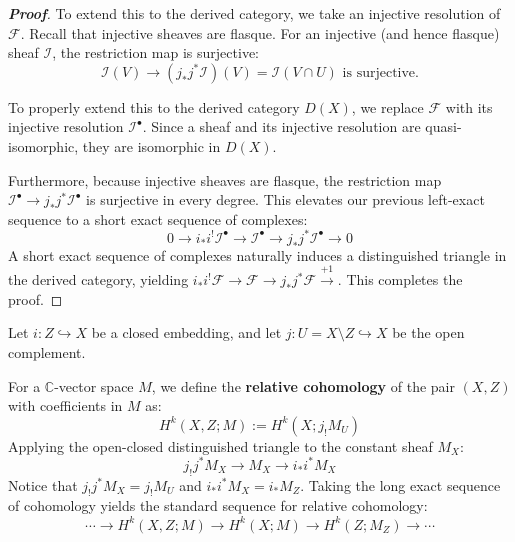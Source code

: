 \begin{proof}[\textbf{Proof}]
To extend this to the derived category, we take an injective resolution of $\mathcal{F}$. Recall that injective sheaves are flasque. For an injective (and hence flasque) sheaf $\mathcal{I}$, the restriction map is surjective:
\begin{equation*}
    \mathcal{I}(V) \longrightarrow (j_* j^* \mathcal{I})(V) = \mathcal{I}(V \cap U) \text{ is surjective.}
\end{equation*}

To properly extend this to the derived category $D(X)$, we replace $\mathcal{F}$ with its injective resolution $\mathcal{I}^\bullet$. Since a sheaf and its injective resolution are quasi-isomorphic, they are isomorphic in $D(X)$. 

Furthermore, because injective sheaves are flasque, the restriction map $\mathcal{I}^\bullet \longrightarrow j_*j^*\mathcal{I}^\bullet$ is surjective in every degree. This elevates our previous left-exact sequence to a short exact sequence of complexes:
$$0 \longrightarrow i_*i^!\mathcal{I}^\bullet \longrightarrow \mathcal{I}^\bullet \longrightarrow j_*j^*\mathcal{I}^\bullet \longrightarrow 0$$
A short exact sequence of complexes naturally induces a distinguished triangle in the derived category, yielding $i_* i^! \mathcal{F} \longrightarrow \mathcal{F} \longrightarrow j_* j^* \mathcal{F} \xrightarrow{+1}$. This completes the proof.
\end{proof}


\begin{example}
    Let $i \colon Z \hookrightarrow X$ be a closed embedding, and let $j \colon U = X \setminus Z \hookrightarrow X$ be the open complement. 

For a $\mathbb{C}$-vector space $M$, we define the \textbf{relative cohomology} of the pair $(X, Z)$ with coefficients in $M$ as:
\begin{equation*}
    H^k(X, Z; M) := H^k(X; j_! M_U)
\end{equation*}
Applying the open-closed distinguished triangle to the constant sheaf $M_X$:
\begin{equation*}
    j_! j^* M_X \longrightarrow M_X \longrightarrow i_* i^* M_X
\end{equation*}
Notice that $j_! j^* M_X = j_! M_U$ and $i_* i^* M_X = i_* M_Z$. Taking the long exact sequence of cohomology yields the standard sequence for relative cohomology:
\begin{equation*}
    \cdots \longrightarrow H^k(X, Z; M) \longrightarrow H^k(X; M) \longrightarrow H^k(Z; M_Z) \longrightarrow \cdots
\end{equation*}
\end{example}

